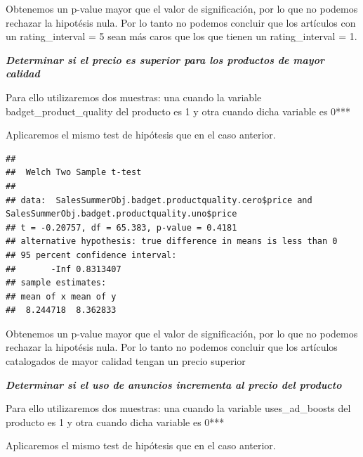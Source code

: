 \documentclass[
]{article}
\newenvironment{Shaded}{\begin{snugshade}}{\end{snugshade}}
\newcommand{\DataTypeTok}[1]{\textcolor[rgb]{0.13,0.29,0.53}{#1}}
\newcommand{\KeywordTok}[1]{\textcolor[rgb]{0.13,0.29,0.53}{\textbf{#1}}}
\newcommand{\NormalTok}[1]{#1}
\newcommand{\OperatorTok}[1]{\textcolor[rgb]{0.81,0.36,0.00}{\textbf{#1}}}
\newcommand{\StringTok}[1]{\textcolor[rgb]{0.31,0.60,0.02}{#1}}
\begin{document}
Obtenemos un p-value mayor que el valor de significación, por lo que no
podemos rechazar la hipotésis nula. Por lo tanto no podemos concluir que
los artículos con un rating\_interval = 5 sean más caros que los que
tienen un rating\_interval = 1.

\textbf{\emph{Determinar si el precio es superior para los productos de
mayor calidad}}

Para ello utilizaremos dos muestras: una cuando la variable
badget\_product\_quality del producto es 1 y otra cuando dicha variable
es 0***

Aplicaremos el mismo test de hipótesis que en el caso anterior.

\begin{Shaded}
\end{Shaded}

\begin{verbatim}
## 
##  Welch Two Sample t-test
## 
## data:  SalesSummerObj.badget.productquality.cero$price and SalesSummerObj.badget.productquality.uno$price
## t = -0.20757, df = 65.383, p-value = 0.4181
## alternative hypothesis: true difference in means is less than 0
## 95 percent confidence interval:
##       -Inf 0.8313407
## sample estimates:
## mean of x mean of y 
##  8.244718  8.362833
\end{verbatim}

Obtenemos un p-value mayor que el valor de significación, por lo que no
podemos rechazar la hipotésis nula. Por lo tanto no podemos concluir que
los artículos catalogados de mayor calidad tengan un precio superior

\textbf{\emph{Determinar si el uso de anuncios incrementa al precio del
producto}}

Para ello utilizaremos dos muestras: una cuando la variable
uses\_ad\_boosts del producto es 1 y otra cuando dicha variable es 0***

Aplicaremos el mismo test de hipótesis que en el caso anterior.

\begin{Shaded}
\end{Shaded}
\end{document}
